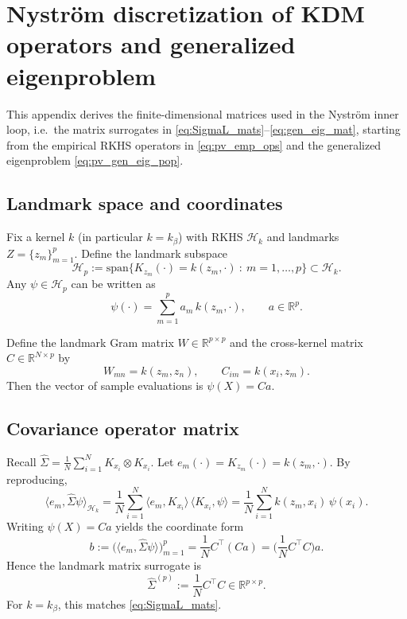 \documentclass[11pt]{article}
\theoremstyle{remark}
\newcommand{\Hk}{\mathcal{H}}
\begin{document}
\section{Nystr\"om discretization of KDM operators and generalized eigenproblem}
\label{app:spectral}

This appendix derives the finite-dimensional matrices used in the Nystr\"om inner loop,
i.e.\ the matrix surrogates in \eqref{eq:SigmaL_mats}--\eqref{eq:gen_eig_mat},
starting from the empirical RKHS operators in \eqref{eq:pv_emp_ops} and the generalized eigenproblem
\eqref{eq:pv_gen_eig_pop}.

\subsection{Landmark space and coordinates}
\label{app:landmark-subspace}

Fix a kernel $k$ (in particular $k=k_\beta$) with RKHS $\Hk_k$ and landmarks $Z=\{z_m\}_{m=1}^p$.
Define the landmark subspace
\[
\mathcal{H}_p := \mathrm{span}\{K_{z_m}(\cdot)=k(z_m,\cdot)\ :\ m=1,\dots,p\}\subset \Hk_k.
\]
Any $\psi\in\mathcal{H}_p$ can be written as
\begin{equation}
\psi(\cdot) = \sum_{m=1}^p a_m\, k(z_m,\cdot),
\qquad a\in\mathbb{R}^p.
\label{eq:app_psi-landmark}
\end{equation}

Define the landmark Gram matrix $W\in\mathbb{R}^{p\times p}$ and the cross-kernel matrix $C\in\mathbb{R}^{N\times p}$ by
\begin{equation}
W_{mn} = k(z_m,z_n),
\qquad
C_{im} = k(x_i,z_m).
\label{eq:app_CW_def}
\end{equation}
Then the vector of sample evaluations is $\psi(X)=Ca$.

\subsection{Covariance operator matrix}
\label{app:sigma-matrix}

Recall $\widehat{\Sigma}=\frac1N\sum_{i=1}^N K_{x_i}\otimes K_{x_i}$.
Let $e_m(\cdot)=K_{z_m}(\cdot)=k(z_m,\cdot)$.
By reproducing,
\[
\big\langle e_m,\widehat{\Sigma}\psi\big\rangle_{\Hk_k}
=
\frac1N\sum_{i=1}^N \langle e_m, K_{x_i}\rangle\, \langle K_{x_i},\psi\rangle
=
\frac1N\sum_{i=1}^N k(z_m,x_i)\,\psi(x_i).
\]
Writing $\psi(X)=Ca$ yields the coordinate form
\[
b := \big(\langle e_m,\widehat{\Sigma}\psi\rangle\big)_{m=1}^p
= \frac1N C^\top (Ca)
= \Big(\frac1N C^\top C\Big)a.
\]
Hence the landmark matrix surrogate is
\begin{equation}
\widehat{\Sigma}^{(p)} := \frac1N C^\top C \in\mathbb{R}^{p\times p}.
\label{eq:app_sigma_p}
\end{equation}
For $k=k_\beta$, this matches \eqref{eq:SigmaL_mats}.
\end{document}
